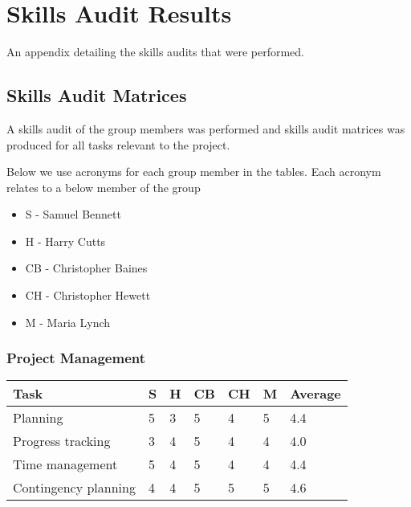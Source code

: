 \chapter{Skills Audit Results} \label{Chapter:Skills Audit Results}

\begin{preamble}
	An appendix detailing the skills audits that were performed.

\end{preamble}

\section{Skills Audit Matrices} 
\label{Section:Skills Audit Matrices}
A skills audit of the group members was performed and skills audit matrices was produced for all tasks relevant to the project.

Below we use acronyms for each group member in the tables. Each acronym relates to a below member of the group

\begin{itemize}
\item S - Samuel Bennett
\item H - Harry Cutts
\item CB - Christopher Baines
\item CH - Christopher Hewett
\item M - Maria Lynch
\end{itemize}

\subsection{Project Management} 
\begin{tabular}{ l || l | l | l | l | l || l}
  Task & S & H & CB & CH & M & Average \\ \hline
  Planning & 5  &  3  &  5  &  4  &  5  &  4.4 \\ 
  Progress tracking &  3  &  4  &  5  &  4  &  4  &  4.0 \\
  Time management &  5  &  4  &  5  &  4  &  4  &  4.4 \\
  Contingency planning &  4  &  4  &  5  &  5  &  5  &  4.6 \\
\end{tabular}


